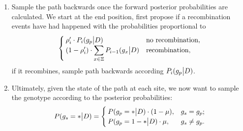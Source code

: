 \documentclass{bioinfo}
\begin{document}
\begin{enumerate}
\item Sample the path backwards once the forward posterior probabilities are calculated. We start at the end position, first propose if a recombination events have had happened with the probabilities proportional to
$$
\begin{cases}
\rho_i' \cdot P_i(g_p \big{|} D) & \text{no recombination},\\
\displaystyle ( 1-\rho_i' ) \cdot \sum_{x\in \Xi} P_{i-1}(g_x \big{|} D) & \text{recombination},
\end{cases}
$$
if it recombines, sample path backwards according $P_i(g_p \big{|} D)$.

\item Ultimately, given the state of the path at each site, we now want to sample the genotype according to the posterior probabilities:
\begin{equation}
P(g_{s} = * \big{|} D) =
\begin{cases}
P(g_{p} = * \big{|} D) \cdot (1-\mu), & g_s = g_p;\\
P(g_{p} = 1 - * \big{|} D) \cdot \mu, & g_s \neq g_p.
\end{cases}
\label{eqn:ps0}
\end{equation}




\end{enumerate}
\end{document}
